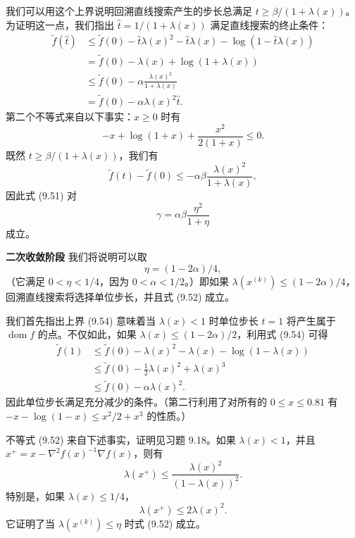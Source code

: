 \documentclass[UTF8, 12pt, fontset=fandol, oneside]{ctexart}
\begin{document}
我们可以用这个上界说明回溯直线搜索产生的步长总满足 $t\geq\beta/(1+\lambda(x))$。为证明这一点，我们指出 $\hat{t}=1/(1+\lambda(x))$ 满足直线搜索的终止条件：
\[
\begin{aligned}
\tilde{f}(\hat{t})
&\leq \tilde{f}(0)-\hat{t}\lambda(x)^2-\hat{t}\lambda(x)-\log(1-\hat{t}\lambda(x))\\
&=\tilde{f}(0)-\lambda(x)+\log(1+\lambda(x))\\
&\leq \tilde{f}(0)-\alpha\frac{\lambda(x)^2}{1+\lambda(x)}\\
&=\tilde{f}(0)-\alpha\lambda(x)^2\hat{t}.
\end{aligned}
\]
第二个不等式来自以下事实：$x\geq0$ 时有
\[
-x+\log(1+x)+\frac{x^2}{2(1+x)}\leq0.
\]
既然 $t\geq\beta/(1+\lambda(x))$，我们有
\[
\tilde{f}(t)-\tilde{f}(0)\leq-\alpha\beta\frac{\lambda(x)^2}{1+\lambda(x)},
\]
因此式 (9.51) 对
\[
\gamma=\alpha\beta\frac{\eta^2}{1+\eta}
\]
成立。

\noindent\textbf{二次收敛阶段}\quad
我们将说明可以取
\[
\eta=(1-2\alpha)/4,
\]
（它满足 $0<\eta<1/4$，因为 $0<\alpha<1/2$。）即如果 $\lambda(x^{(k)})\leq(1-2\alpha)/4$，回溯直线搜索将选择单位步长，并且式 (9.52) 成立。

我们首先指出上界 (9.54) 意味着当 $\lambda(x)<1$ 时单位步长 $t=1$ 将产生属于 $\operatorname{dom} f$ 的点。不仅如此，如果 $\lambda(x)\leq(1-2\alpha)/2$，利用式 (9.54) 可得
\[
\begin{aligned}
\tilde{f}(1)
&\leq \tilde{f}(0)-\lambda(x)^2-\lambda(x)-\log(1-\lambda(x))\\
&\leq \tilde{f}(0)-\frac{1}{2}\lambda(x)^2+\lambda(x)^3\\
&\leq \tilde{f}(0)-\alpha\lambda(x)^2.
\end{aligned}
\]
因此单位步长满足充分减少的条件。（第二行利用了对所有的 $0\leq x\leq0.81$ 有 $-x-\log(1-x)\leq x^2/2+x^3$ 的性质。）

不等式 (9.52) 来自下述事实，证明见习题 9.18。如果 $\lambda(x)<1$，并且 $x^+=x-\nabla^2 f(x)^{-1}\nabla f(x)$，则有
\begin{equation}
\lambda(x^+)\leq \frac{\lambda(x)^2}{(1-\lambda(x))^2}.
\tag{9.55}
\end{equation}
特别是，如果 $\lambda(x)\leq1/4$，
\[
\lambda(x^+)\leq2\lambda(x)^2.
\]
它证明了当 $\lambda(x^{(k)})\leq\eta$ 时式 (9.52) 成立。
\end{document}
